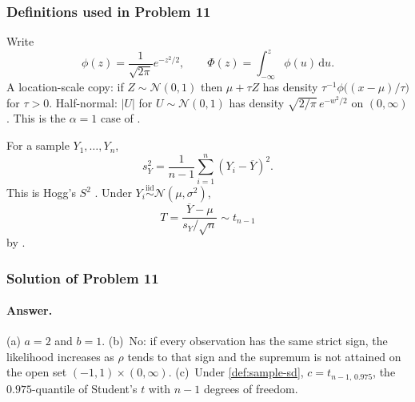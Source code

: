 \documentclass[11pt,a4paper]{article}
\begin{document}
\subsubsection{Definitions used in Problem 11}

\begin{notation}
\label{not:phi-Phi}
Write
\[
\phi(z)
=
\frac{1}{\sqrt{2\pi}}e^{-z^{2}/2},
\qquad
\Phi(z)
=
\int_{-\infty}^{z}\phi(u)\,\mathrm{d}u.
\]
A location-scale copy: if \(Z\sim\mathcal{N}(0,1)\) then \(\mu+\tau Z\) has density \(\tau^{-1}\phi\bigl((x-\mu)/\tau\bigr)\) for \(\tau>0\). Half-normal: \(|U|\) for \(U\sim\mathcal{N}(0,1)\) has density \(\sqrt{2/\pi}\,e^{-w^{2}/2}\) on \((0,\infty)\). This is the \(\alpha=1\) case of \citep[\S4.7, Exercise~1(d)]{ren2024}.
\end{notation}

\begin{definition}
\label{def:sample-sd}
For a sample \(Y_{1},\dots,Y_{n}\),
\[
s_{Y}^{2}
=
\frac{1}{n-1}\sum_{i=1}^{n}(Y_{i}-\overline{Y})^{2}.
\]
This is Hogg's \(S^{2}\) \citep[\S4.2, Example~4.2.1]{hogg2019}. Under \(Y_{i}\stackrel{\mathrm{iid}}{\sim}\mathcal{N}(\mu,\sigma^{2})\),
\[
T
=
\frac{\overline{Y}-\mu}{s_{Y}/\sqrt{n}}
\sim
t_{n-1}
\]
by \citep[Theorem~3.6.1(d)]{hogg2019}.
\end{definition}

\subsubsection{Solution of Problem 11}

\paragraph{Answer.}

(a) \(a=2\) and \(b=1\). (b)~No: if every observation has the same strict sign, the likelihood increases as \(\rho\) tends to that sign and the supremum is not attained on the open set \((-1,1)\times(0,\infty)\). (c)~Under \cref{def:sample-sd}, \(c=t_{n-1,\,0.975}\), the \(0.975\)-quantile of Student's \(t\) with \(n-1\) degrees of freedom.
\end{document}
